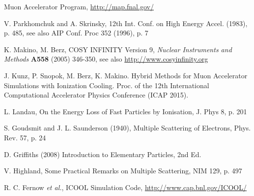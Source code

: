 \documentclass{jacow}
\begin{document}

\begin{thebibliography}{9}

Muon Accelerator Program, \url{http://map.fnal.gov/}

V. Parkhomchuk and A. Skrinsky, 12th Int. Conf. on High Energy Accel. (1983), p. 485, see also AIP Conf. Proc 352 (1996), p. 7 


K. Makino, M. Berz, COSY INFINITY Version 9, \emph{Nuclear Instruments and Methods} \textbf{A558} (2005) 346-350, see also \url{http://www.cosyinfinity.org}



J. Kunz, P. Snopok, M. Berz, K. Makino. Hybrid Methods for Muon Accelerator Simulations with Ionization Cooling. Proc. of the 12th International Computational Accelerator Physics Conference (ICAP 2015).

L. Landau, On the Energy Loss of Fast Particles by Ionisation, J. Phys 8, p. 201

S. Goudsmit and J. L. Saunderson (1940), Multiple Scattering of Electrons, Phys. Rev. 57, p. 24

D. Griffiths (2008) Introduction to Elementary Particles, 2nd Ed. 

V. Highland, Some Practical Remarks on Multiple Scattering, NIM 129, p. 497

R. C. Fernow \emph{et al.}, ICOOL Simulation Code, \url{http://www.cap.bnl.gov/ICOOL/}


\end{thebibliography}
\end{document}
